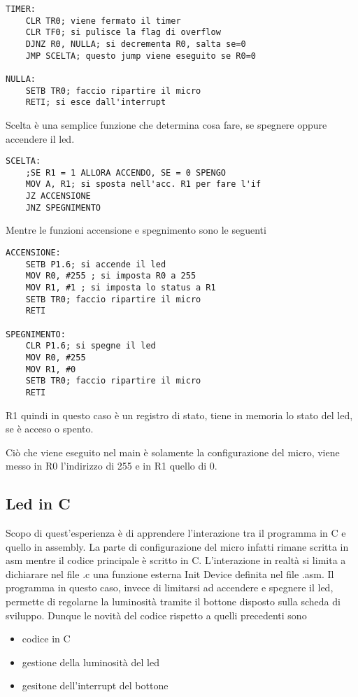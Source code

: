 \documentclass[main.tex]{subfiles}
\begin{document}
\begin{lstlisting}[caption=Funzione timer]
TIMER:
    CLR TR0; viene fermato il timer
    CLR TF0; si pulisce la flag di overflow
    DJNZ R0, NULLA; si decrementa R0, salta se=0
    JMP SCELTA; questo jump viene eseguito se R0=0

NULLA:
    SETB TR0; faccio ripartire il micro
    RETI; si esce dall'interrupt
\end{lstlisting}
 
 Scelta è una semplice funzione che determina cosa fare, se spegnere oppure accendere il led.
 \begin{lstlisting}[caption=Funzione scelta]
 SCELTA:
	;SE R1 = 1 ALLORA ACCENDO, SE = 0 SPENGO
	MOV A, R1; si sposta nell'acc. R1 per fare l'if
	JZ ACCENSIONE
	JNZ SPEGNIMENTO
 \end{lstlisting}

Mentre le funzioni accensione e spegnimento sono le seguenti
\begin{lstlisting}[caption=Funzioni accensione e spegnimento]
ACCENSIONE:
	SETB P1.6; si accende il led
	MOV R0, #255 ; si imposta R0 a 255
	MOV R1, #1 ; si imposta lo status a R1
	SETB TR0; faccio ripartire il micro
	RETI

SPEGNIMENTO:
	CLR P1.6; si spegne il led
	MOV R0, #255
	MOV R1, #0
	SETB TR0; faccio ripartire il micro
	RETI
\end{lstlisting}
R1 quindi in questo caso è un registro di stato, tiene in memoria lo stato del led, se è acceso o spento.

Ciò che viene eseguito nel main è solamente la configurazione del micro, viene messo in R0 l'indirizzo di 255 e in R1 quello di 0.

\subsection{Led in C}\label{led in C}
Scopo di quest'esperienza è di apprendere l'interazione tra il programma in C e quello in assembly. La parte di configurazione del micro infatti rimane scritta in asm mentre il codice principale è scritto in C. L'interazione in realtà si limita a dichiarare nel file .c una funzione esterna Init Device definita nel file .asm. Il programma in questo caso, invece di limitarsi ad accendere e spegnere il led, permette di regolarne la luminosità tramite il bottone disposto sulla scheda di sviluppo. Dunque le novità del codice rispetto a quelli precedenti sono 
\begin{itemize}
    \item codice in C
    \item gestione della luminosità del led
    \item gesitone dell'interrupt del bottone
\end{itemize}
\end{document}
